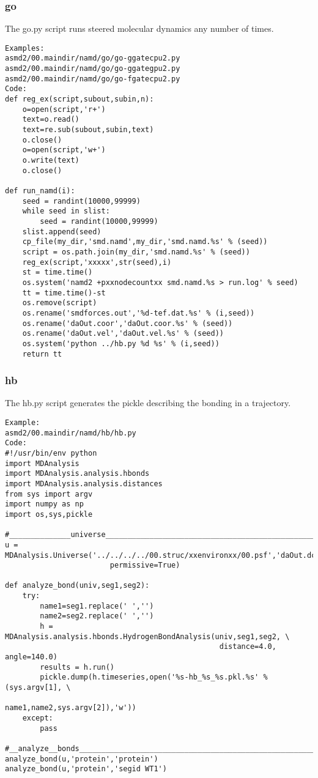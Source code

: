 \documentclass[11pt]{article}
\begin{document}
\subsubsection{go}
The go.py script runs steered molecular dynamics any number of times.
\begin{verbatim}
Examples:
asmd2/00.maindir/namd/go/go-ggatecpu2.py
asmd2/00.maindir/namd/go/go-ggategpu2.py
asmd2/00.maindir/namd/go/go-fgatecpu2.py
Code:
def reg_ex(script,subout,subin,n):
    o=open(script,'r+')
    text=o.read()
    text=re.sub(subout,subin,text)
    o.close()
    o=open(script,'w+')
    o.write(text)
    o.close()

def run_namd(i):
    seed = randint(10000,99999)
    while seed in slist:
        seed = randint(10000,99999)
    slist.append(seed)
    cp_file(my_dir,'smd.namd',my_dir,'smd.namd.%s' % (seed))
    script = os.path.join(my_dir,'smd.namd.%s' % (seed))
    reg_ex(script,'xxxxx',str(seed),i)
    st = time.time()
    os.system('namd2 +pxxnodecountxx smd.namd.%s > run.log' % seed)
    tt = time.time()-st
    os.remove(script)
    os.rename('smdforces.out','%d-tef.dat.%s' % (i,seed))
    os.rename('daOut.coor','daOut.coor.%s' % (seed))
    os.rename('daOut.vel','daOut.vel.%s' % (seed))
    os.system('python ../hb.py %d %s' % (i,seed))
    return tt
\end{verbatim}

\subsubsection{hb}
The hb.py script generates the pickle describing the bonding in a trajectory.
\begin{verbatim}
Example:
asmd2/00.maindir/namd/hb/hb.py
Code:
#!/usr/bin/env python
import MDAnalysis
import MDAnalysis.analysis.hbonds
import MDAnalysis.analysis.distances
from sys import argv
import numpy as np
import os,sys,pickle

#______________universe________________________________________________________
u = MDAnalysis.Universe('../../../../00.struc/xxenvironxx/00.psf','daOut.dcd',\
                        permissive=True)

def analyze_bond(univ,seg1,seg2):
    try:
        name1=seg1.replace(' ','')
        name2=seg2.replace(' ','')
        h = MDAnalysis.analysis.hbonds.HydrogenBondAnalysis(univ,seg1,seg2, \
                                                 distance=4.0, angle=140.0)
        results = h.run()
        pickle.dump(h.timeseries,open('%s-hb_%s_%s.pkl.%s' % (sys.argv[1], \
                                              name1,name2,sys.argv[2]),'w'))
    except:
        pass

#__analyze__bonds______________________________________________________________
analyze_bond(u,'protein','protein')
analyze_bond(u,'protein','segid WT1')
\end{verbatim}
\end{document}
